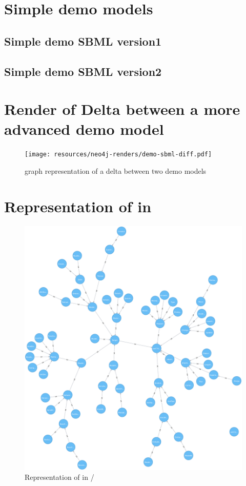 \chapter{Simple demo \sbml models}
\section{Simple demo SBML version1}
\label{sec:appendix:simple-demo:v1}


\section{Simple demo SBML version2}
\label{sec:appendix:simple-demo:v2}


\chapter{Render of Delta between a more advanced demo model}
\begin{figure}[h]
	\centering
	\texttt{[image: resources/neo4j-renders/demo-sbml-diff.pdf]}
	\caption{\neoj graph representation of a delta between two demo models}
	\label{fig:appendix:demo-sbml-diff}
\end{figure}

\chapter{Representation of \comodi in \masymos}
\begin{figure}[h]
	\centering
	\includegraphics[width=\textwidth,height=0.5\textheight,keepaspectratio]{resources/neo4j-renders/comodi.pdf}
	\caption{Representation of \comodi in \masymos/\neoj}
	\label{fig:appendix:neo4j-comodi}
\end{figure}

